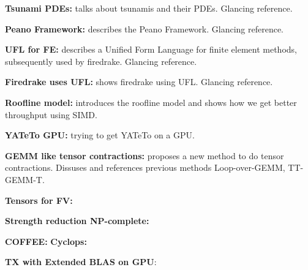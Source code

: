 \textbf{Tsunami PDEs:} \cite{tsunamiPDE} talks about tsunamis and their PDEs. Glancing reference.

\textbf{Peano Framework:} \cite{PeanoFramework} describes the Peano Framework. Glancing reference.

\textbf{UFL for FE:} \cite{UFLforFE} describes a Unified Form Language for finite element methods, subsequently used by firedrake. Glancing reference.

\textbf{Firedrake uses UFL:} \cite{FiredrakeUFL} shows firedrake using UFL. Glancing reference.

\textbf{Roofline model:} \cite{roofline} introduces the roofline model and shows how we get better throughput using SIMD.

\textbf{YATeTo GPU:} \cite{YATeToGPU} trying to get YATeTo on a GPU. 

\textbf{GEMM like tensor contractions:} \cite{GEMMlikeTC} proposes a new method to do tensor contractions. Dissuses and references previous methods Loop-over-GEMM, TT-GEMM-T.


\textbf{Tensors for FV:} \cite{tensorFV}

\textbf{Strength reduction NP-complete:} \cite{strengthReductionNP}

\textbf{COFFEE:} \cite{COFFEE}
\textbf{Cyclops:} \cite{cyclops}

\textbf{TX with Extended BLAS on GPU}: \cite{TCBLASGPU}

